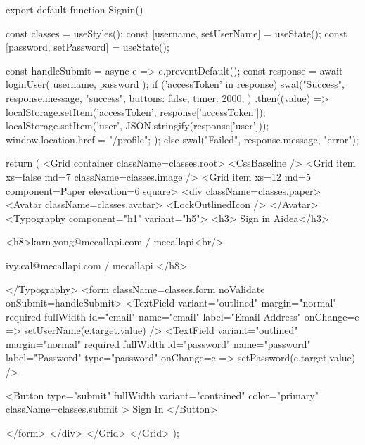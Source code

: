 export default function Signin() {
  const classes = useStyles();
  const [username, setUserName] = useState();
  const [password, setPassword] = useState();

  const handleSubmit = async e => {
    e.preventDefault();
    const response = await loginUser({
      username,
      password
    });
    if ('accessToken' in response) {
      swal("Success", response.message, "success", {
        buttons: false,
        timer: 2000,
      })
      .then((value) => {
        localStorage.setItem('accessToken', response['accessToken']);
        localStorage.setItem('user', JSON.stringify(response['user']));
        window.location.href = "/profile";
      });
    } else {
      swal("Failed", response.message, "error");
    }
  }

  return (
    <Grid container className={classes.root}>
      <CssBaseline />
      <Grid item xs={false} md={7} className={classes.image} />
      <Grid item xs={12} md={5} component={Paper} elevation={6} square>
        <div className={classes.paper}>
          <Avatar className={classes.avatar}>
            <LockOutlinedIcon />
          </Avatar>
          <Typography component="h1" variant="h5">
           <h3> Sign in  Aidea</h3> 
          
            <h8>karn.yong@mecallapi.com / mecallapi<br/>
          
          ivy.cal@mecallapi.com / mecallapi </h8>
            
          </Typography>
          <form className={classes.form} noValidate onSubmit={handleSubmit}>
            <TextField
              variant="outlined"
              margin="normal"
              required
              fullWidth
              id="email"
              name="email"
              label="Email Address"
              onChange={e => setUserName(e.target.value)}
            />
            <TextField
              variant="outlined"
              margin="normal"
              required
              fullWidth
              id="password"
              name="password"
              label="Password"
              type="password"
              onChange={e => setPassword(e.target.value)}
            />
           
            <Button
              type="submit"
              fullWidth
              variant="contained"
              color="primary"
              className={classes.submit}
            >
              Sign In
            </Button>
            
          </form>
        </div>
      </Grid>
    </Grid>
  );
}